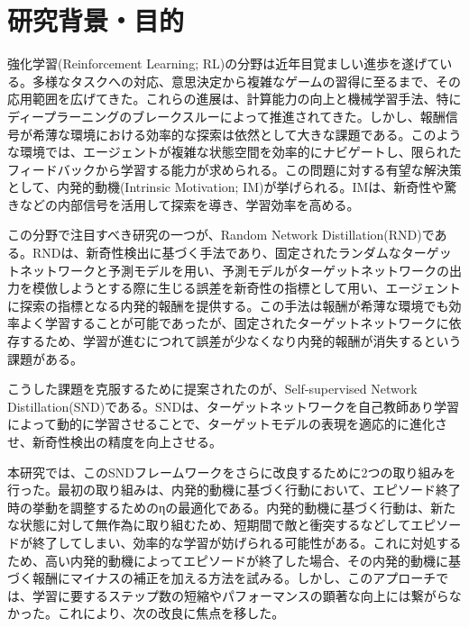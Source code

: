 \maketitle

\section{研究背景・目的}
強化学習(Reinforcement Learning; RL)の分野は近年目覚ましい進歩を遂げている。多様なタスクへの対応、意思決定から複雑なゲームの習得に至るまで、その応用範囲を広げてきた。これらの進展は、計算能力の向上と機械学習手法、特にディープラーニングのブレークスルーによって推進されてきた。しかし、報酬信号が希薄な環境における効率的な探索は依然として大きな課題である。このような環境では、エージェントが複雑な状態空間を効率的にナビゲートし、限られたフィードバックから学習する能力が求められる。この問題に対する有望な解決策として、内発的動機(Intrinsic Motivation; IM)\cite{IM}が挙げられる。IMは、新奇性や驚きなどの内部信号を活用して探索を導き、学習効率を高める。

この分野で注目すべき研究の一つが、Random Network Distillation(RND)\cite{RND}である。RNDは、新奇性検出に基づく手法であり、固定されたランダムなターゲットネットワークと予測モデルを用い、予測モデルがターゲットネットワークの出力を模倣しようとする際に生じる誤差を新奇性の指標として用い、エージェントに探索の指標となる内発的報酬を提供する。この手法は報酬が希薄な環境でも効率よく学習することが可能であったが、固定されたターゲットネットワークに依存するため、学習が進むにつれて誤差が少なくなり内発的報酬が消失するという課題がある。

こうした課題を克服するために提案されたのが、Self-supervised Network Distillation(SND)\cite{SND}である。SNDは、ターゲットネットワークを自己教師あり学習によって動的に学習させることで、ターゲットモデルの表現を適応的に進化させ、新奇性検出の精度を向上させる。

本研究では、このSNDフレームワークをさらに改良するために2つの取り組みを行った。最初の取り組みは、内発的動機に基づく行動において、エピソード終了時の挙動を調整するためのηの最適化である。内発的動機に基づく行動は、新たな状態に対して無作為に取り組むため、短期間で敵と衝突するなどしてエピソードが終了してしまい、効率的な学習が妨げられる可能性がある。これに対処するため、高い内発的動機によってエピソードが終了した場合、その内発的動機に基づく報酬にマイナスの補正を加える方法を試みる。しかし、このアプローチでは、学習に要するステップ数の短縮やパフォーマンスの顕著な向上には繋がらなかった。これにより、次の改良に焦点を移した。

